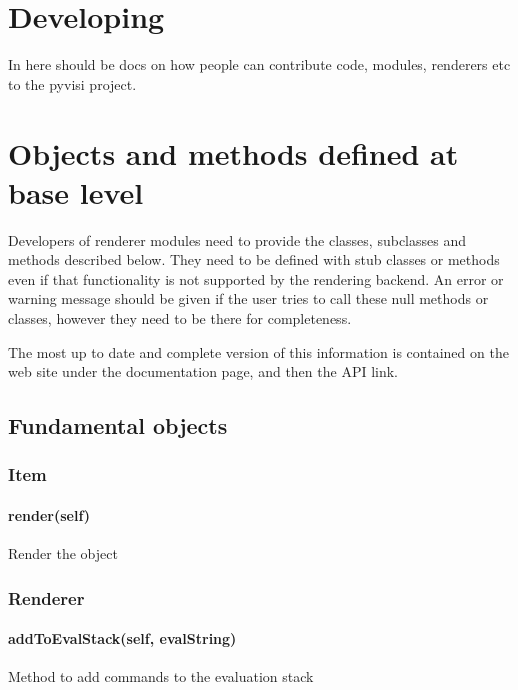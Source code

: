 
\chapter{Developing \pyvisi}
\label{chap:developingPyvisi}

In here should be docs on how people can contribute code, modules, renderers
etc to the pyvisi project.

\chapter{Objects and methods defined at base level}

Developers of \pyvisi renderer modules need to provide the classes, subclasses
and methods described below.  They need to be defined with stub classes or
methods even if that functionality is not supported by the rendering backend.
An error or warning message should be given if the user tries to call these
null methods or classes, however they need to be there for completeness.

The most up to date and complete version of this information is contained on
the \pyvisi web site under the documentation page, and then the API link.

\section{Fundamental objects}

\subsection{Item}

\subsubsection{render(self)}

Render the object

\subsection{Renderer}

\subsubsection{addToEvalStack(self, evalString)}

Method to add commands to the evaluation stack

